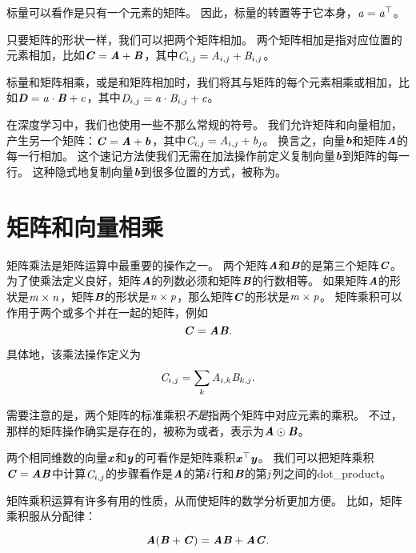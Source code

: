 标量可以看作是只有一个元素的矩阵。
因此，标量的转置等于它本身，$\Sa=\Sa^\top$。


只要矩阵的形状一样，我们可以把两个矩阵相加。
两个矩阵相加是指对应位置的元素相加，比如$\MC=\MA+\MB$，其中$\SC_{i,j}= \SA_{i,j}+\SB_{i,j}$。


标量和矩阵相乘，或是和矩阵相加时，我们将其与矩阵的每个元素相乘或相加，比如$\MD = \Sa \cdot \MB + \Sc$，其中$\SD_{i,j} = \Sa\cdot  \SB_{i,j} + \Sc$。


在深度学习中，我们也使用一些不那么常规的符号。
我们允许矩阵和向量相加，产生另一个矩阵：$\MC=\MA + \Vb$，其中$\SC_{i,j}= \SA_{i,j} + \Sb_{j}$。
换言之，向量$\Vb$和矩阵$\MA$的每一行相加。
这个速记方法使我们无需在加法操作前定义复制向量$\Vb$到矩阵的每一行。
这种隐式地复制向量$\Vb$到很多位置的方式，被称为。




\section{矩阵和向量相乘}
\label{sec:multiplying_matrices_and_vectors}

矩阵乘法是矩阵运算中最重要的操作之一。
两个矩阵$\MA$和$\MB$的是第三个矩阵$\MC$。
为了使乘法定义良好，矩阵$\MA$的列数必须和矩阵$\MB$的行数相等。
如果矩阵$\MA$的形状是$\Sm \times \Sn$，矩阵$\MB$的形状是$\Sn\times \Sp$，那么矩阵$\MC$的形状是$\Sm\times \Sp$。
矩阵乘积可以作用于两个或多个并在一起的矩阵，例如
\begin{equation}
    \MC=\MA\MB.
\end{equation}


具体地，该乘法操作定义为
\begin{equation}
    \SC_{i,j}=\sum_k \SA_{i,k} \SB_{k,j}.
\end{equation}


需要注意的是，两个矩阵的标准乘积\emph{不是}指两个矩阵中对应元素的乘积。
不过，那样的矩阵操作确实是存在的，被称为或者，表示为$\MA\odot\MB$。


两个相同维数的向量$\Vx$和$\Vy$的可看作是矩阵乘积$\Vx^\top\Vy$。
我们可以把矩阵乘积$\MC=\MA\MB$中计算$\SC_{i,j}$的步骤看作是$\MA$的第$\Si$行和$\MB$的第$\Sj$列之间的\gls{dot_product}。


矩阵乘积运算有许多有用的性质，从而使矩阵的数学分析更加方便。
比如，矩阵乘积服从分配律：


\begin{equation}
    \MA(\MB+\MC)=\MA\MB +\MA\MC.
\end{equation}


